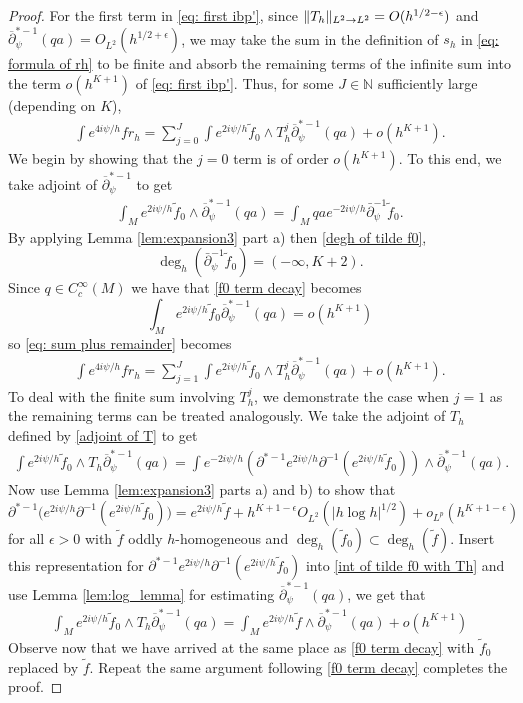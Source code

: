 \documentclass[12pt]{amsart}
\def\p{\partial}
\DeclarePairedDelimiter\norm{\lVert}{\rVert}
\theoremstyle{definition}
\theoremstyle{remark}
\newcommand{\eps}{\epsilon}
\newcommand{\op}{\overline \p}
\begin{document}
\begin{proof}
For the first term in \eqref{eq: first ibp'}, since $\norm{T_h}_{L^2\to L^2}=O(h^{1/2-\eps})$ and $\op_\psi^{*-1}(qa)=O_{L^2}(h^{1/2+\eps})$, we may take the sum in the definition of $s_h$ in \eqref{eq: formula of rh} to be finite and absorb the remaining terms of the infinite sum into the term $o(h^{K+1})$ of \eqref{eq: first ibp'}. Thus, for some $J\in \mathbb N$ sufficiently large (depending on $K$),
\begin{eqnarray}
\label{eq: sum plus remainder}
 \int e^{4i\psi/h}f r_h=\sum_{j=0}^J \int e^{2i\psi/h}\tilde f_0\wedge T_h^j\op_\psi^{*-1}(qa)+ o(h^{K+1}).
\end{eqnarray}
We begin by showing that the $j =0$ term is of order $o(h^{K+1})$. To this end, we take adjoint of $\op_\psi^{*-1}$ to get
\begin{eqnarray}
\label{f0 term decay}
\int_M e^{2i\psi/h}\tilde f_0\wedge \op_\psi^{*-1}(qa) = \int_M qae^{-2i\psi/h}\bar\partial^{-1}_\psi \tilde f_0.
\end{eqnarray}
By applying Lemma \ref{lem:expansion3} part a) then \eqref{degh of tilde f0},
$$\deg_h(\bar\partial^{-1}_\psi \tilde f_0) =(-\infty, K+2).$$
 Since $q\in C^\infty_c(M)$ we have that \eqref{f0 term decay} becomes
$$\int_M e^{2i\psi/h}\tilde f_0\op_\psi^{*-1}(qa) = o(h^{K+1})$$
so \eqref{eq: sum plus remainder} becomes
\begin{eqnarray}\label{eq2: sum plus remainder} 
\int e^{4i\psi/h}f r_h=\sum_{j=1}^J \int e^{2i\psi/h}\tilde f_0\wedge T_h^j\op_\psi^{*-1}(qa)+ o(h^{K+1 }).
\end{eqnarray}
To deal with the finite sum involving $T_h^j$, we demonstrate the case when $j =1$ as the remaining terms can be treated analogously. We take the adjoint of $T_h$ defined by \eqref{adjoint of T} to get
\begin{eqnarray}
\label{int of tilde f0 with Th}
\int e^{2i\psi/h}\tilde f_0 \wedge T_h\op_\psi^{*-1}(qa) = \int e^{-2i\psi/h}\left(\p^{*-1}e^{2i\psi/h} \p^{-1} (e^{2i\psi/h} \tilde f_0) \right)\wedge\op_\psi^{*-1}(qa).
\end{eqnarray}
Now use Lemma \ref{lem:expansion3} parts a) and b) to show that 
$$\p^{*-1}\Big(e^{2i\psi/h} \p^{-1} (e^{2i\psi/h} \tilde f_0)\Big) = e^{2i\psi/h}\tilde f +h^{K+1-\epsilon} O_{L^2}(|h\log h|^{1/2})+ o_{L^p}(h^{K+1-\epsilon})$$
for all $\epsilon >0$ with $\tilde f$ oddly $h$-homogeneous and $ \deg_h(\tilde f_0)\subset \deg_h(\tilde f)$.
 Insert this representation for $\p^{*-1}e^{2i\psi/h} \p^{-1} (e^{2i\psi/h} \tilde f_0)$ into \eqref{int of tilde f0 with Th} and use Lemma \ref{lem:log_lemma} for estimating $\op_\psi^{*-1} (qa)$, we get that
\begin{eqnarray}
\int_M e^{2i\psi/h}\tilde f_0 \wedge T_h\op_\psi^{*-1}(qa) = \int_M e^{2i\psi/h} \tilde f \wedge \op_\psi^{*-1}(qa) + o(h^{K+1})
\end{eqnarray}
Observe now that we have arrived at the same place as \eqref{f0 term decay} with $\tilde f_0$ replaced by $\tilde f$. Repeat the same argument following \eqref{f0 term decay} completes the proof.%


\end{proof}
\end{document}
